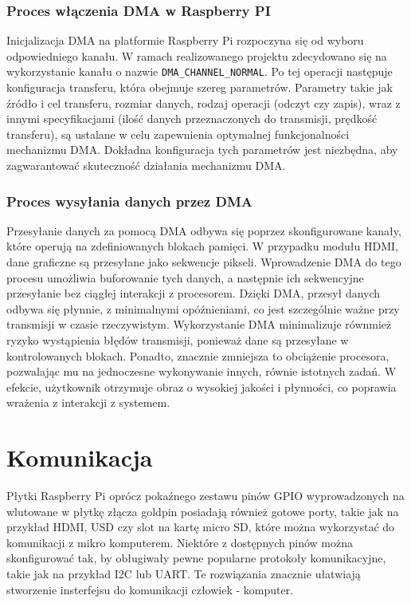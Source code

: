 \documentclass[shortabstract]{iithesis}
\begin{document}
\subsection{Proces włączenia DMA w Raspberry PI}
Inicjalizacja DMA na platformie Raspberry Pi rozpoczyna się od wyboru odpowiedniego kanału. W ramach realizowanego projektu zdecydowano się na wykorzystanie kanału o nazwie \texttt{DMA\_CHANNEL\_NORMAL}. Po tej operacji następuje konfiguracja transferu, która obejmuje szereg parametrów. Parametry takie jak źródło i cel transferu, rozmiar danych, rodzaj operacji (odczyt czy zapis), wraz z innymi specyfikacjami (ilość danych przeznaczonych do transmisji, prędkość transferu), są ustalane w celu zapewnienia optymalnej funkcjonalności mechanizmu DMA. Dokładna konfiguracja tych parametrów jest niezbędna, aby zagwarantować skuteczność działania mechanizmu DMA.
\subsection{Proces wysyłania danych przez DMA}
Przesyłanie danych za pomocą DMA odbywa się poprzez skonfigurowane kanały, które operują na zdefiniowanych blokach pamięci. W przypadku modułu HDMI, dane graficzne są przesyłane jako sekwencje pikseli. Wprowadzenie DMA do tego procesu umożliwia buforowanie tych danych, a następnie ich sekwencyjne przesyłanie bez ciągłej interakcji z procesorem. Dzięki DMA, przesył danych odbywa się płynnie, z minimalnymi opóźnieniami, co jest szczególnie ważne przy transmisji w czasie rzeczywistym. Wykorzystanie DMA minimalizuje równmież ryzyko wystąpienia błędów transmisji, ponieważ dane są przesyłane w kontrolowanych blokach. Ponadto, znacznie zmniejsza to obciążenie procesora, pozwalając mu na jednoczesne wykonywanie innych, równie istotnych zadań. W efekcie, użytkownik otrzymuje obraz o wysokiej jakości i płynności, co poprawia wrażenia z interakcji z systemem.


\chapter{Komunikacja}
Płytki Raspberry Pi oprócz pokaźnego zestawu pinów GPIO wyprowadzonych na wlutowane w płytkę złącza goldpin posiadają również gotowe porty, takie jak na przykład HDMI, USD czy slot na kartę micro SD, które można wykorzystać do komunikacji z mikro komputerem. Niektóre z dostępnych pinów można skonfigurować tak, by obługiwały pewne popularne protokoły komunikacyjne, takie jak na przykład I2C lub UART. Te rozwiązania znacznie ułatwiają stworzenie insterfejsu do komunikacji człowiek - komputer.
\end{document}
